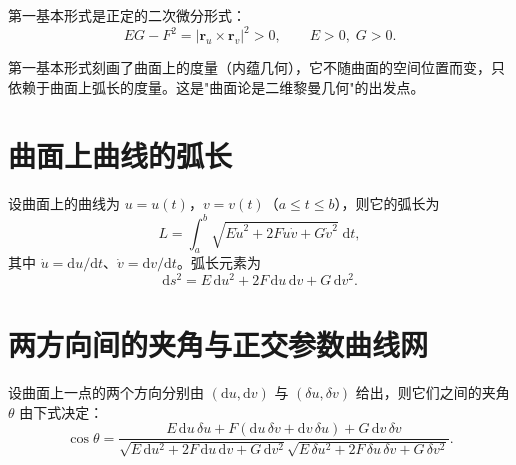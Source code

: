 \begin{theorem}[第一基本形式的正定性]
	第一基本形式是正定的二次微分形式：
	\begin{equation}
		EG-F^{2}=\left|\boldsymbol{r}_u\times\boldsymbol{r}_v\right|^{2}>0,\qquad E>0,\;G>0.
		\label{eq:第一基本形式:正定性}
	\end{equation}
\end{theorem}

\begin{remark}
	第一基本形式刻画了曲面上的度量（内蕴几何），它不随曲面的空间位置而变，只依赖于曲面上弧长的度量。这是"曲面论是二维黎曼几何"的出发点。
\end{remark}

\section{曲面上曲线的弧长}

\begin{proposition}[弧长公式]
	设曲面上的曲线为 $u=u(t)$，$v=v(t)$（$a\leqslant t\leqslant b$），则它的弧长为
	\begin{equation}
		L=\int_{a}^{b}\sqrt{E\dot{u}^{2}+2F\dot{u}\dot{v}+G\dot{v}^{2}}\;\mathrm{d}t,
		\label{eq:曲面弧长:公式}
	\end{equation}
	其中 $\dot u=\mathrm{d}u/\mathrm{d}t$、$\dot v=\mathrm{d}v/\mathrm{d}t$。弧长元素为
	\begin{equation}
		\mathrm{d}s^{2}=E\,\mathrm{d}u^{2}+2F\,\mathrm{d}u\,\mathrm{d}v+G\,\mathrm{d}v^{2}.
		\label{eq:曲面弧长:弧长元素}
	\end{equation}
\end{proposition}

\section{两方向间的夹角与正交参数曲线网}

\begin{definition}[两方向间的夹角]
	设曲面上一点的两个方向分别由 $(\mathrm{d}u,\mathrm{d}v)$ 与 $(\delta u,\delta v)$ 给出，则它们之间的夹角 $\theta$ 由下式决定：
	\begin{equation}
		\cos\theta=
		\frac{E\,\mathrm{d}u\,\delta u+F(\mathrm{d}u\,\delta v+\mathrm{d}v\,\delta u)+G\,\mathrm{d}v\,\delta v}
		{\sqrt{E\,\mathrm{d}u^{2}+2F\,\mathrm{d}u\,\mathrm{d}v+G\,\mathrm{d}v^{2}}
		 \sqrt{E\,\delta u^{2}+2F\,\delta u\,\delta v+G\,\delta v^{2}}}.
		\label{eq:两方向夹角:公式}
	\end{equation}
\end{definition}

